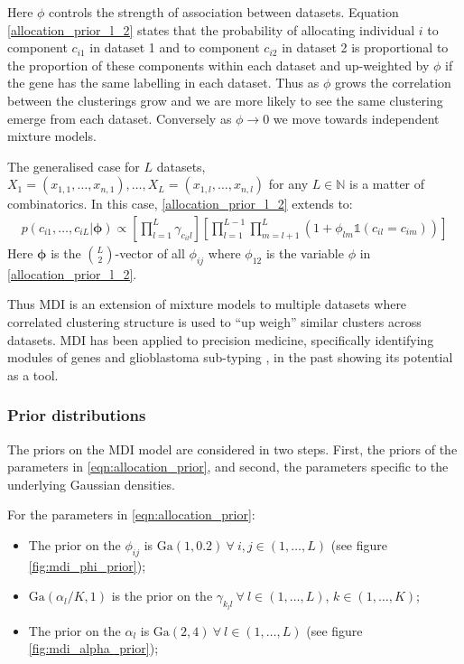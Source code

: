 \documentclass[14pt]{extarticle} %
\begin{document}
	Here $\phi$ controls the strength of association between datasets. Equation \eqref{allocation_prior_l_2} states that the probability of allocating individual $i$ to component $c_{i1}$ in dataset 1 and to component $c_{i2}$ in dataset 2 is proportional to the proportion of these components within each dataset and up-weighted by $\phi$ if the gene has the same labelling in each dataset. Thus as $\phi$ grows the correlation between the clusterings grow and we are more likely to see the same clustering emerge from each dataset. Conversely as $\phi \to 0$ we move towards independent mixture models. 
	
	The generalised case for $L$ datasets, $X_1 = (x_{1,1},\ldots,x_{n,1}),\ldots, X_L = (x_{1,l},\ldots,x_{n,l})$ for any $L \in \mathbb{N}$ is a matter of combinatorics. In this case, \eqref{allocation_prior_l_2} extends to:
	\begin{align} \label{eqn:allocation_prior}
	p(c_{i1},\ldots,c_{iL} | \boldsymbol{\phi}) \propto \left[\prod_{l=1}^L\gamma_{c_{il}l} \right]\left[\prod_{l=1}^{L-1}\prod_{m=l+1}^L\left(1+\phi_{lm}\mathbb{1}(c_{il} = c_{im}) \right)\right]
	\end{align}
	Here $\boldsymbol{\phi}$ is the ${L \choose 2}$-vector of all $\phi_{ij}$ where $\phi_{12}$ is the variable $\phi$ in \eqref{allocation_prior_l_2}.

	Thus MDI is an extension of mixture models to multiple datasets where correlated clustering structure is used to ``up weigh'' similar clusters across datasets. MDI has been applied to precision medicine, specifically identifying modules of genes and glioblastoma sub-typing \citep{SavageIdentifyingcancersubtypes2013a}, in the past showing its potential as a tool.
	
	\subsubsection{Prior distributions}
	The priors on the MDI model are considered in two steps. First, the priors of the parameters in \eqref{eqn:allocation_prior}, and second, the parameters specific to the underlying Gaussian densities.
	
	For the parameters in \eqref{eqn:allocation_prior}:
	\begin{itemize}
		\item The prior on the $\phi_{ij}$ is $\text{Ga}(1, 0.2) \: \forall \: i,j \in (1, \ldots, L)$ (see figure \ref{fig:mdi_phi_prior}); 
		\item $\text{Ga}(\alpha_l / K, 1)$ is the prior on the $\gamma_{k_ll}  \: \forall \: l \in (1, \ldots, L)$, $k \in (1,\ldots, K)$;
		\item The prior on the $\alpha_l$ is $\text{Ga}(2,4) \: \forall \: l \in (1,\ldots,L)$ (see figure \ref{fig:mdi_alpha_prior});
	\end{itemize}
\end{document}
